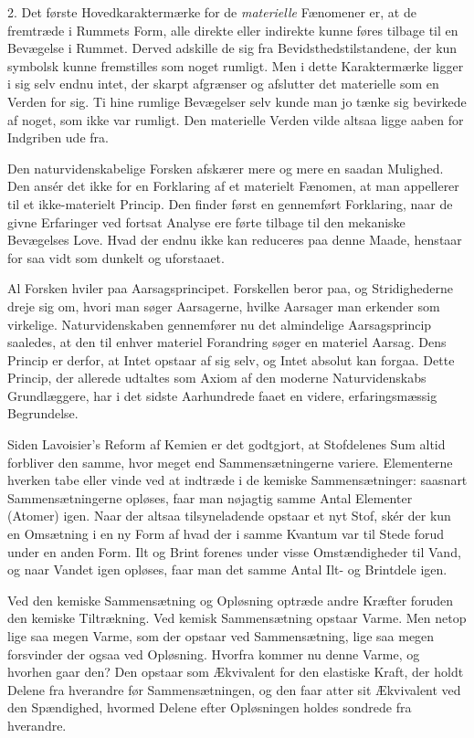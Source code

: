 \documentclass[12pt,a4paper,openany]{book}
\newcommand{\opage}[1]{\marginnote{\footnotesize\textit{[#1]}}}
\begin{document}
2. Det første Hovedkaraktermærke for de \emph{materielle} Fænomener er,
at de fremtræde i Rummets Form, alle direkte eller indirekte kunne føres
tilbage til en Bevægelse i Rummet. Derved adskille de sig fra
Bevidsthedstilstandene, der kun symbolsk kunne fremstilles som noget
rumligt. Men i dette Karaktermærke ligger i sig selv endnu intet, der
skarpt afgrænser og afslutter det materielle som en Verden for sig. Ti
hine rumlige Bevægelser selv kunde man jo tænke sig bevirkede af noget,
som ikke var rumligt. Den materielle Verden vilde altsaa ligge aaben for
Indgriben ude fra.

Den naturvidenskabelige Forsken afskærer mere og mere en saadan
Mulighed. Den ansér det ikke for en Forklaring af et materielt Fænomen,
at man appellerer til et ikke-materielt Princip. Den finder først en
gennemført Forklaring, naar de givne Erfaringer ved fortsat Analyse ere
førte tilbage til den mekaniske Bevægelses Love. Hvad der endnu ikke kan
reduceres paa denne Maade, henstaar for saa vidt som dunkelt og
uforstaaet.


\opage{38}Al Forsken hviler paa Aarsagsprincipet. Forskellen beror paa,
og Stridighederne dreje sig om, hvori man søger Aarsagerne, hvilke
Aarsager man erkender som virkelige. Naturvidenskaben gennemfører nu det
almindelige Aarsagsprincip saaledes, at den til enhver materiel
Forandring søger en materiel Aarsag. Dens Princip er derfor, at Intet
opstaar af sig selv, og Intet absolut kan forgaa. Dette Princip, der
allerede udtaltes som Axiom af den moderne Naturvidenskabs Grundlæggere,
har i det sidste Aarhundrede faaet en videre, erfaringsmæssig
Begrundelse.

Siden Lavoisier’s Reform af Kemien er det godtgjort, at Stofdelenes Sum
altid forbliver den samme, hvor meget end Sammensætningerne variere.
Elementerne hverken tabe eller vinde ved at indtræde i de kemiske
Sammensætninger: saasnart Sammensætningerne opløses, faar man nøjagtig
samme Antal Elementer (Atomer) igen. Naar der altsaa tilsyneladende
opstaar et nyt Stof, skér der kun en Omsætning i en ny Form af hvad der
i samme Kvantum var til Stede forud under en anden Form. Ilt og Brint
forenes under visse Omstændigheder til Vand, og naar Vandet igen
opløses, faar man det samme Antal Ilt- og Brintdele igen.

Ved den kemiske Sammensætning og Opløsning optræde andre Kræfter foruden
den kemiske Tiltrækning. Ved kemisk Sammensætning opstaar Varme. Men
netop lige saa megen Varme, som der opstaar ved Sammensætning, lige saa
megen forsvinder der ogsaa ved Opløsning. Hvorfra kommer nu denne Varme,
og hvorhen gaar den? Den opstaar som Ækvivalent for den elastiske Kraft,
der holdt Delene fra hverandre før Sammensætningen, og den faar atter
sit Ækvivalent ved den Spændighed, hvormed Delene efter Opløsningen
holdes sondrede fra hverandre.
\end{document}
